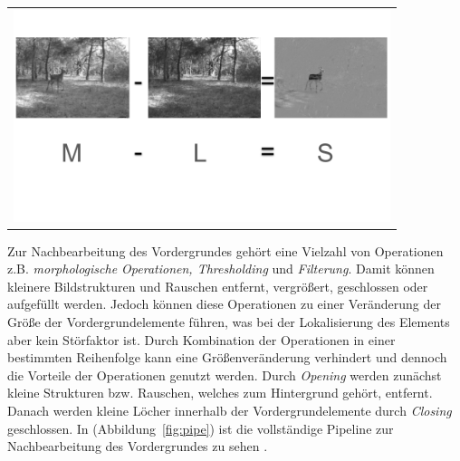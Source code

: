 \begin{center}
\begin{tabular}{c}
\includegraphics[trim={0, 4cm, 0 ,5cm},clip=ture,width=11cm]{img/Segmentierung/foreground-image}
\end{tabular}
\label{fig:foreground}
\end{center}
\noindent Zur Nachbearbeitung des Vordergrundes gehört eine Vielzahl von Operationen 
z.B. \textit{morphologische Operationen, Thresholding} und \textit{Filterung}.
Damit können kleinere Bildstrukturen und Rauschen entfernt, vergrößert, geschlossen oder aufgefüllt werden. Jedoch können diese Operationen zu einer Veränderung der Größe der Vordergrundelemente führen, was bei der Lokalisierung des Elements aber kein Störfaktor ist. Durch Kombination der Operationen in einer bestimmten Reihenfolge kann eine Größenveränderung verhindert und dennoch die Vorteile der Operationen genutzt werden. Durch \textit{Opening} werden zunächst kleine Strukturen bzw. Rauschen, welches zum Hintergrund gehört, entfernt. Danach werden kleine Löcher innerhalb der Vordergrundelemente durch \textit{Closing} geschlossen. In (Abbildung~\ref{fig:pipe}) ist die vollständige Pipeline zur Nachbearbeitung des Vordergrundes zu sehen \cite{DBLP:journals/corr/Giraldo-Zuluaga17}.
